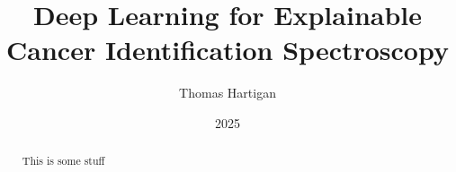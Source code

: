 \documentclass{article}
\title{Deep Learning for Explainable Cancer Identification Spectroscopy}
\author{Thomas Hartigan}
\date{2025}
\begin{document}
\maketitle
\begin{abstract}
    This is some stuff
\end{abstract}









\newpage




\end{document}
